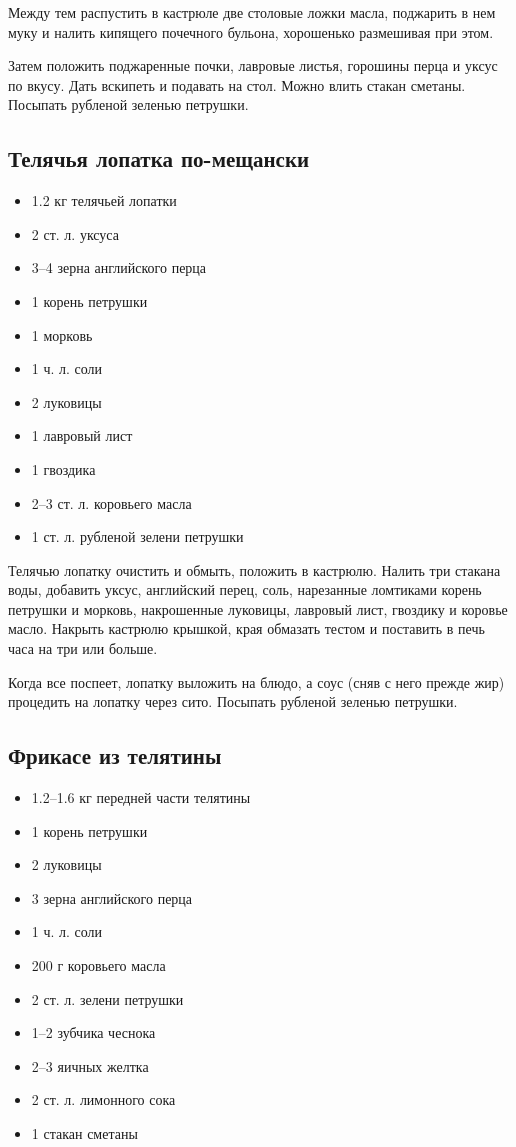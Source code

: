 Между тем распустить в кастрюле две столовые ложки масла, поджарить в нем муку и налить кипящего почечного бульона, хорошенько размешивая при этом.

Затем положить поджаренные почки, лавровые листья, горошины перца и уксус по вкусу. Дать вскипеть и подавать на стол. Можно влить стакан сметаны. Посыпать рубленой зеленью петрушки.

\subsection{Телячья лопатка по-мещански}

\begin{itemize}
	\item 1.2 кг телячьей лопатки
    \item 2 ст. л. уксуса 
    \item 3–4 зерна английского перца
    \item 1 корень петрушки
    \item 1 морковь
    \item 1 ч. л. соли
    \item 2 луковицы 
    \item 1 лавровый лист
    \item 1 гвоздика 
    \item 2–3 ст. л. коровьего масла
    \item 1 ст. л. рубленой зелени петрушки
\end{itemize}

Телячью лопатку очистить и обмыть, положить в кастрюлю. Налить три стакана воды, добавить уксус, английский перец, соль, нарезанные ломтиками корень петрушки и морковь, накрошенные луковицы, лавровый лист, гвоздику и коровье масло. Накрыть кастрюлю крышкой, края обмазать тестом и поставить в печь часа на три или больше.

Когда все поспеет, лопатку выложить на блюдо, а соус (сняв с него прежде жир) процедить на лопатку через сито. Посыпать рубленой зеленью петрушки.

\subsection{Фрикасе из телятины}

\begin{itemize}
	\item 1.2–1.6 кг передней части телятины 
    \item 1 корень петрушки 
    \item 2 луковицы 
    \item 3 зерна английского перца
    \item 1 ч. л. соли
    \item 200 г коровьего масла 
    \item 2 ст. л. зелени петрушки
    \item 1–2 зубчика чеснока
    \item 2–3 яичных желтка
    \item 2 ст. л. лимонного сока
    \item 1 стакан сметаны
\end{itemize}

